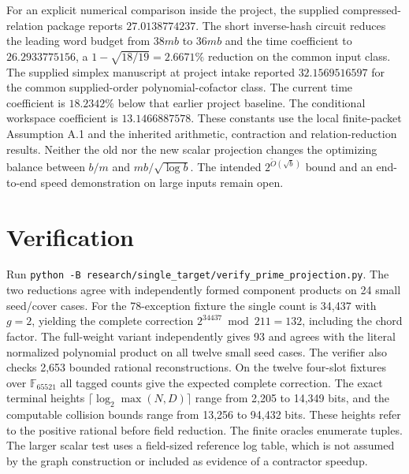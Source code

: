 \documentclass[11pt]{article}
\begin{document}
For an explicit numerical comparison inside the project, the
supplied compressed-relation package reports $27.0138774237$.
The short inverse-hash circuit reduces the leading word budget
from $38mb$ to $36mb$ and the time coefficient to $26.2933775156$,
a $1-\sqrt{18/19}=2.6671\%$ reduction on the common input class.
The supplied simplex manuscript at project intake reported
$32.1569516597$ for the common supplied-order polynomial-cofactor
class. The current time coefficient is $18.2342\%$ below that earlier
project baseline. The conditional workspace coefficient is $13.1466887578$.
These constants use the local finite-packet Assumption A.1 and
the inherited arithmetic, contraction and relation-reduction
results. Neither the old nor the new scalar projection changes
the optimizing balance between $b/m$ and $mb/\sqrt{\log b}$.
The intended $2^{\widetilde O(\sqrt b)}$ bound and an end-to-end
speed demonstration on large inputs remain open.

\section{Verification}
Run \texttt{python -B research/single\_target/verify\_prime\_projection.py}.
The two reductions agree with independently formed component products
on 24 small seed/cover cases. For the 78-exception fixture the
single count is 34,437 with $g=2$, yielding the complete correction
$2^{34437}\bmod 211=132$, including the chord factor. The full-weight
variant independently gives 93 and agrees with the literal normalized
polynomial product on all twelve small seed cases.
The verifier also checks 2,653 bounded rational reconstructions.
On the twelve four-slot fixtures over $\mathbb F_{65521}$ all tagged
counts give the expected complete correction. The exact terminal
heights $\lceil\log_2\max(N,D)\rceil$ range from 2,205 to 14,349
bits, and the computable collision bounds range from 13,256 to
94,432 bits. These heights refer to the positive rational before
field reduction. The finite oracles enumerate tuples. The larger
scalar test uses a field-sized reference log table, which is not
assumed by the graph construction or included as evidence of a
contractor speedup.
\end{document}
